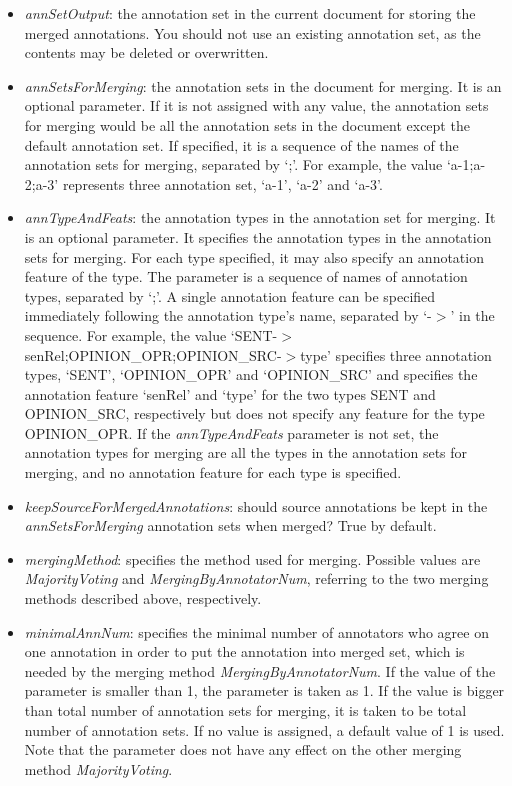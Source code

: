 \begin{itemize}
\item {\em annSetOutput}: the annotation set in the current document for
  storing the merged annotations. You should not use an existing annotation
  set, as the contents may be deleted or overwritten.
\item {\em annSetsForMerging}: the annotation sets in the document for
  merging.  It is an optional parameter.  If it is not assigned with any
  value, the annotation sets for merging would be all the annotation sets in
  the document except the default annotation set.  If specified, it is a
  sequence of the names of the annotation sets for merging, separated by
  `;'. For example, the value `a-1;a-2;a-3' represents three annotation set,
  `a-1', `a-2' and `a-3'.
\item {\em annTypeAndFeats}: the annotation types in the annotation set for
  merging.  It is an optional parameter. It specifies the annotation types in
  the annotation sets for merging. For each type specified, it may also
  specify an annotation feature of the type. The parameter is a sequence of
  names of annotation types, separated by `;'. A single annotation feature can
  be specified immediately following the annotation type's name, separated by
  `-$>$' in the sequence. For example, the value
  `SENT-$>$senRel;OPINION\_OPR;OPINION\_SRC-$>$type' specifies three
  annotation types, `SENT', `OPINION\_OPR' and `OPINION\_SRC' and specifies
  the annotation feature `senRel' and `type' for the two types SENT and
  OPINION\_SRC, respectively but does not specify any feature for the type
  OPINION\_OPR. If the {\em annTypeAndFeats} parameter is not set, the
  annotation types for merging are all the types in the annotation sets for
  merging, and no annotation feature for each type is specified.
\item {\em keepSourceForMergedAnnotations}: should source annotations be kept
  in the {\em annSetsForMerging} annotation sets when merged? True by default.
\item {\em mergingMethod}: specifies the method used for merging. Possible
  values are {\em MajorityVoting} and {\em MergingByAnnotatorNum}, referring
  to the two merging methods described above, respectively.
\item {\em minimalAnnNum}: specifies the minimal number of annotators who
  agree on one annotation in order to put the annotation into merged set,
  which is needed by the merging method {\em MergingByAnnotatorNum}. If the
  value of the parameter is smaller than 1, the parameter is taken as 1. If
  the value is bigger than total number of annotation sets for merging, it is
  taken to be total number of annotation sets. If no value is assigned, a
  default value of 1 is used. Note that the parameter does not have any effect
  on the other merging method {\em MajorityVoting}.
\end{itemize}


